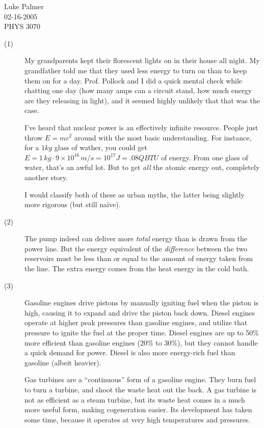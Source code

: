 \documentclass[12pt]{article}
\begin{document}
\noindent Luke Palmer\\
02-16-2005\\
PHYS 3070

\begin{description}
\item[(1)] My grandparents kept their florescent lights on in their
house all night.  My grandfather told me that they used less energy to
turn on than to keep them on for a day.  Prof. Pollock and I did a quick
mental check while chatting one day (how many amps can a circuit stand,
how much energy are they releasing in light), and it seemed highly
unlikely that that was the case.  

I've heard that nuclear power is an effectively infinite resource.
People just throw $E = mc^2$ around with the most basic understanding.
For instance, for a $1 \textit{kg}$ glass of wather, you could get $E =
1\,\mathit{kg} \cdot 9 \times 10^16\,m/s = 10^17 J = .08 QBTU$ of
energy.  From one glass of water, that's an awful lot.  But to get
\textit{all} the atomic energy out, completely another story.

I would classify both of these as urban myths, the latter being slightly
more rigorous (but still na\"ive).

\item[(2)] The pump indeed can deliver more \textit{total} energy than
is drawn from the power line.  But the energy equivalent of the
\textit{difference} between the two reservoirs must be less than or
equal to the amount of energy taken from the line.  The extra energy
comes from the heat energy in the cold bath.

\item[(3)] Gasoline engines drive pistons by manually igniting fuel when
the piston is high, causing it to expand and drive the piston back down.
Diesel engines operate at higher peak pressures than gasoline engines,
and utilize that pressure to ignite the fuel at the proper time.  Diesel
engines are up to 50\% more efficient than gasoline engines (20\% to
30\%), but they cannot handle a quick demand for power.  Diesel is also
more energy-rich fuel than gasoline (albeit heavier).

Gas turbines are a ``continuous'' form of a gasoline engine.  They burn
fuel to turn a turbine, and shoot the waste heat out the back.  A gas
turbine is not as efficient as a steam turbine, but its waste heat comes
in a much more useful form, making cogeneration easier.  Its development
has taken some time, because it operates at very high temperatures and
pressures.

\end{description}
\end{document}
